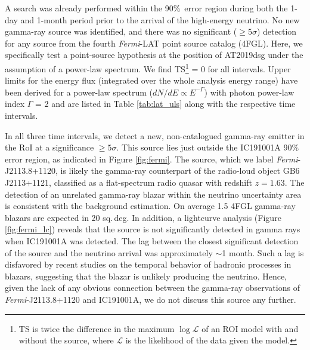 A search was already performed within the 90\%\ error region during both the 1-day and 1-month period prior to the arrival of the high-energy neutrino\cite{garrappa_buson:gcn25932}. No new gamma-ray source was identified, and there was no significant ($\geq 5 \sigma$) detection for any source from the fourth \textit{Fermi}-LAT point source catalog (4FGL\cite{2019arXiv190210045T}). Here, we specifically test a point-source hypothesis at the position of AT2019dsg under the assumption of a power-law spectrum. We find TS\footnote{TS is twice the difference in the maximum $\log \mathcal{L}$ of an ROI model with and without the source, where $\mathcal{L}$ is the likelihood of the data given the model.} = 0 for all intervals. Upper limits for the energy flux (integrated over the whole analysis energy range) have been derived for a power-law spectrum ($dN/dE \propto E^{-\Gamma}$) with photon power-law index $\Gamma$ = 2 and are listed in Table \ref{tab:lat_uls} along with the respective time intervals.

In all three time intervals, we detect a new, non-catalogued gamma-ray emitter in the RoI at a significance $\geq 5 \sigma$. This source lies just outside the IC191001A 90$\%$ error region, as indicated in Figure \ref{fig:fermi}. The source, which we label \textit{Fermi}-J2113.8+1120, is likely the gamma-ray counterpart of the radio-loud object GB6 J2113+1121, classified as a flat-spectrum radio quasar with redshift $z = 1.63$\cite{2013ApJ...767...14P}. The detection of an unrelated gamma-ray blazar within the neutrino uncertainty area is consistent with the background estimation. On average 1.5 4FGL gamma-ray blazars are expected in 20 sq.\,deg. In addition, a lightcurve analysis (Figure \ref{fig:fermi_lc}) reveals that the source is not significantly detected in gamma rays when IC191001A was detected. The lag between the closest significant detection of the source and the neutrino arrival was approximately $\sim$1 month. Such a lag is disfavored by recent studies on the temporal behavior of hadronic processes in blazars\cite{2015ApJ...802..133D,2019NatAs...3...88G}, suggesting that the blazar is unlikely producing the neutrino. %
Hence, given the lack of any obvious connection between the gamma-ray observations of \textit{Fermi}-J2113.8+1120 and IC191001A, we do not discuss this source any further.

